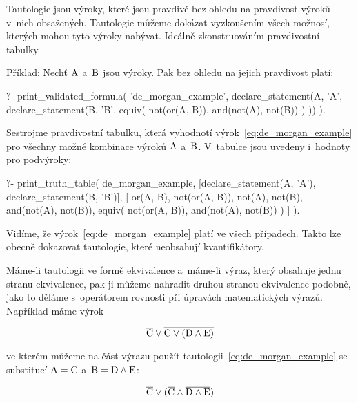 Tautologie jsou výroky, které jsou pravdivé bez ohledu na pravdivost výroků v~nich obsažených. Tautologie můžeme dokázat vyzkoušením všech možnosí, kterých mohou tyto výroky nabývat. Ideálně zkonstruováním pravdivostní tabulky.

Příklad: Nechť \(\mathrm{A}\) a~\(\mathrm{B}\) jsou výroky. Pak bez ohledu na jejich pravdivost platí:

\begin{prolog}
?- print_validated_formula(
	'de_morgan_example',
	declare_statement(A, 'A', declare_statement(B, 'B',
		equiv(
			not(or(A, B)),
			and(not(A), not(B))
		)
	))
).
\end{prolog}

Sestrojme pravdivostní tabulku, která vyhodnotí výrok~\eqref{eq:de_morgan_example} pro všechny možné kombinace výroků \(\mathrm{A}\) a~\(\mathrm{B}\). V~tabulce jsou uvedeny i~hodnoty pro podvýroky:

\begin{prolog}
?- print_truth_table(
	de_morgan_example,
	[declare_statement(A, 'A'), declare_statement(B, 'B')],
	[
		or(A, B),
		not(or(A, B)),
		not(A),
		not(B),
		and(not(A), not(B)),
		equiv(
			not(or(A, B)),
			and(not(A), not(B))
		)
	]
).
\end{prolog}

Vidíme, že výrok~\eqref{eq:de_morgan_example} platí ve všech případech. Takto lze obecně dokazovat tautologie, které neobsahují kvantifikátory.

Máme-li tautologii ve formě ekvivalence a~máme-li výraz, který obsahuje jednu stranu ekvivalence, pak ji můžeme nahradit druhou stranou ekvivalence podobně, jako to děláme s~operátorem rovnosti při úpravách matematických výrazů. Například máme výrok

\begin{equation}
\overline{\mathrm{C}} \lor \overline{\mathrm{C} \lor (\mathrm{D} \land \mathrm{E})}
\end{equation}

ve kterém můžeme na část výrazu použít tautologii~\eqref{eq:de_morgan_example} se substitucí \(\mathrm{A} = \mathrm{C}\) a~\(\mathrm{B} = \mathrm{D} \land \mathrm{E}\):

\begin{equation}
\overline{\mathrm{C}} \lor (\overline{\mathrm{C}} \land \overline{\mathrm{D} \land \mathrm{E}})
\end{equation}

